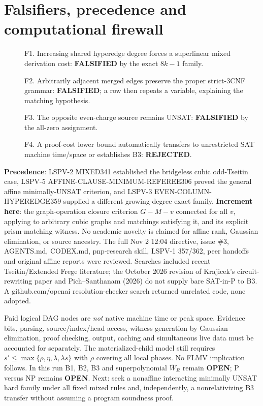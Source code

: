 \documentclass[11pt]{article}
\begin{document}
\section*{Falsifiers, precedence and computational firewall}
\begin{description}
\item[] F1. Increasing shared hyperedge degree forces a superlinear mixed derivation cost: \textbf{FALSIFIED} by the exact \(8k-1\) family.
\item[] F2. Arbitrarily adjacent merged edges preserve the proper strict-3CNF grammar: \textbf{FALSIFIED}; a row then repeats a variable, explaining the matching hypothesis.
\item[] F3. The opposite even-charge source remains UNSAT: \textbf{FALSIFIED} by the all-zero assignment.
\item[] F4. A proof-cost lower bound automatically transfers to unrestricted SAT machine time/space or establishes B3: \textbf{REJECTED}.
\end{description}
\textbf{Precedence}: LSPV-2 MIXED341 established the bridgeless cubic odd-Tseitin case, LSPV-5 AFFINE-CLAUSE-MINIMUM-REFEREE306 proved the general affine minimally-UNSAT criterion, and LSPV-3 EVEN-COLUMN-HYPEREDGE359 supplied a different growing-degree exact family. \textbf{Increment here}: the graph-operation closure criterion \(G-M-v\) connected for all \(v\), applying to arbitrary cubic graphs and matchings satisfying it, and its explicit prism-matching witness. No academic novelty is claimed for affine rank, Gaussian elimination, or source ancestry. The full Nov 2 12:04 directive, issue \#3, AGENTS.md, CODEX.md, pnp-research skill, LSPV-1 357/362, peer handoffs and original affine reports were reviewed. Searches included recent Tseitin/Extended Frege literature; the October 2026 revision of Krajicek's circuit-rewriting paper and Pich--Santhanam (2026) do not supply bare SAT-in-P to B3. A github.com/openai resolution-checker search returned unrelated code, none adopted.

Paid logical DAG nodes are \emph{not} native machine time or peak space. Evidence bits, parsing, source/index/head access, witness generation by Gaussian elimination, proof checking, output, caching and simultaneous live data must be accounted for separately. The materialized-child model still requires \(s'\le\max\{\rho,\eta,\lambda,\lambda s\}\) with \(\rho\) covering all local phases. No FLMV implication follows. In this run B1, B2, B3 and superpolynomial \(\overline W_R\) remain \textbf{OPEN}; P versus NP remains \textbf{OPEN}. Next: seek a nonaffine interacting minimally UNSAT hard family under all fixed mixed rules and, independently, a nonrelativizing B3 transfer without assuming a program soundness proof.
\end{document}
